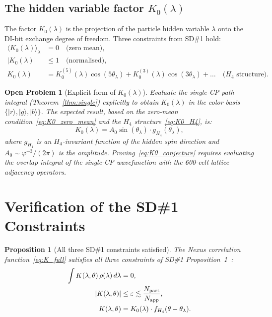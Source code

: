 \documentclass[11pt,a4paper]{article}
\newtheorem{proposition}[theorem]{Proposition}
\newtheorem{openprob}[theorem]{Open Problem}
\newcommand{\phig}{\varphi}
\newcommand{\eps}{\varepsilon}
\newcommand{\Napp}{N_{\rm app}}
\newcommand{\Npart}{N_{\rm part}}
\newcommand{\ket}[1]{|#1\rangle}
\begin{document}
\subsection{The hidden variable factor $K_0(\lambda)$}

The factor $K_0(\lambda)$ is the projection of the particle
hidden variable $\lambda$ onto the DI-bit exchange degree of
freedom.  Three constraints from SD\#1 hold:
\begin{align}
\langle K_0(\lambda)\rangle_\lambda &= 0
  \quad\text{(zero mean)}, \label{eq:K0_zero_mean} \\
|K_0(\lambda)| &\leq 1
  \quad\text{(normalised)}, \label{eq:K0_bounded} \\
K_0(\lambda) &= K_0^{(5)}(\lambda)\cos(5\theta_\lambda)
  + K_0^{(3)}(\lambda)\cos(3\theta_\lambda) + \ldots
  \quad\text{($H_4$ structure)}. \label{eq:K0_H4}
\end{align}

\begin{openprob}[Explicit form of $K_0(\lambda)$]
\label{op:K0}
Evaluate the single-CP path integral (Theorem~\ref{thm:single})
explicitly to obtain $K_0(\lambda)$ in the color basis $\{\ket{r},
\ket{g}, \ket{b}\}$.  The expected result, based on the zero-mean
condition~\eqref{eq:K0_zero_mean} and the $H_4$
structure~\eqref{eq:K0_H4}, is:
\begin{equation}
K_0(\lambda) = A_0 \sin(\theta_\lambda) \cdot g_{H_4}(\theta_\lambda),
\label{eq:K0_conjecture}
\end{equation}
where $g_{H_4}$ is an $H_4$-invariant function of the hidden spin
direction and $A_0 \sim \phig^{-3}/(2\pi)$ is the amplitude.
Proving~\eqref{eq:K0_conjecture} requires evaluating the overlap
integral of the single-CP wavefunction with the 600-cell lattice
adjacency operators.
\end{openprob}

\section{Verification of the SD\#1 Constraints}
\label{sec:verification}

\begin{proposition}[All three SD\#1 constraints satisfied]
\label{prop:constraints}
The Nexus correlation function~\eqref{eq:K_full} satisfies all
three constraints of SD\#1 Proposition~1~\citep{cpp_sd1}:
\begin{align}
\int K(\lambda,\theta)\,\rho(\lambda)\,d\lambda &= 0,
  \label{eq:c1} \\
|K(\lambda,\theta)| &\leq \eps \lesssim \frac{\Npart}{\Napp},
  \label{eq:c2} \\
K(\lambda,\theta) &= K_0(\lambda) \cdot f_{H_4}(\theta - \theta_\lambda).
  \label{eq:c3}
\end{align}
\end{proposition}
\end{document}
